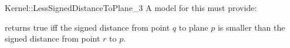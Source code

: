 \begin{ccRefFunctionObjectConcept}{Kernel::LessSignedDistanceToPlane_3}
A model for this must provide:


{returns true iff the signed distance from point $q$ to plane $p$ is
smaller than the signed distance from point $r$ to $p$.}

\ccSeeAlso
{}\\

\end{ccRefFunctionObjectConcept}
